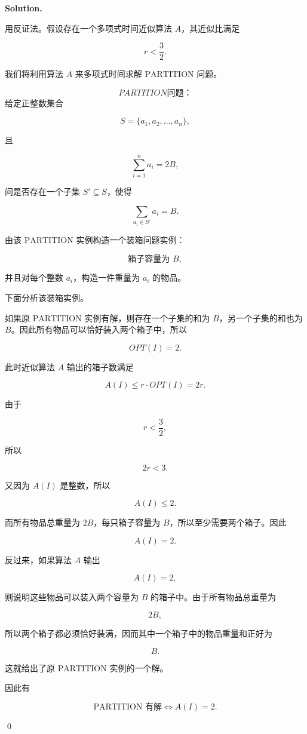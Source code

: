 \documentclass[11pt]{article}
\newenvironment{solution}{
\par\noindent\textbf{Solution.}\par\noindent
}{\qed}
\begin{document}
\begin{solution}

用反证法。假设存在一个多项式时间近似算法 \(A\)，其近似比满足

\[
r<\frac32.
\]

我们将利用算法 \(A\) 来多项式时间求解 \(\text{PARTITION}\) 问题。

\[
PARTITION 问题：
\]
给定正整数集合

\[
S=\{a_1,a_2,\ldots,a_n\},
\]

且

\[
\sum_{i=1}^n a_i = 2B,
\]

问是否存在一个子集 \(S'\subseteq S\)，使得

\[
\sum_{a_i\in S'} a_i = B.
\]

由该 \(\text{PARTITION}\) 实例构造一个装箱问题实例：

\[
\text{箱子容量为 } B,
\]

并且对每个整数 \(a_i\)，构造一件重量为 \(a_i\) 的物品。

下面分析该装箱实例。

如果原 \(\text{PARTITION}\) 实例有解，则存在一个子集的和为 \(B\)，另一个子集的和也为 \(B\)。因此所有物品可以恰好装入两个箱子中，所以

\[
OPT(I)=2.
\]

此时近似算法 \(A\) 输出的箱子数满足

\[
A(I)\leq r\cdot OPT(I)=2r.
\]

由于

\[
r<\frac32,
\]

所以

\[
2r<3.
\]

又因为 \(A(I)\) 是整数，所以

\[
A(I)\leq 2.
\]

而所有物品总重量为 \(2B\)，每只箱子容量为 \(B\)，所以至少需要两个箱子。因此

\[
A(I)=2.
\]

反过来，如果算法 \(A\) 输出

\[
A(I)=2,
\]

则说明这些物品可以装入两个容量为 \(B\) 的箱子中。由于所有物品总重量为

\[
2B,
\]

所以两个箱子都必须恰好装满，因而其中一个箱子中的物品重量和正好为

\[
B.
\]

这就给出了原 \(\text{PARTITION}\) 实例的一个解。

因此有

\[
\text{PARTITION 有解}
\iff
A(I)=2.
\]


\end{solution}
\end{document}
